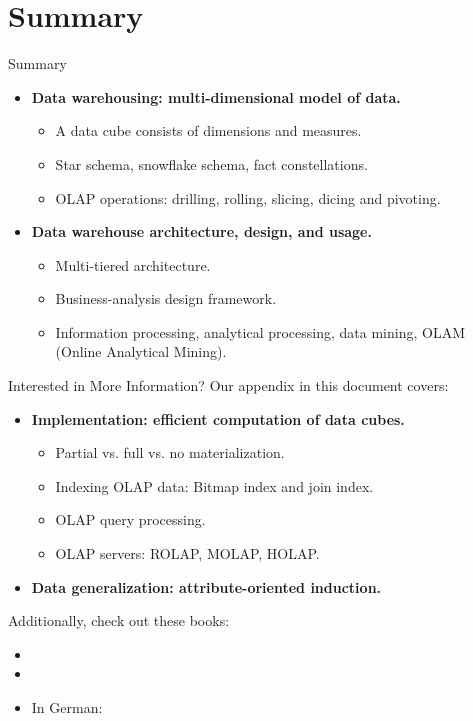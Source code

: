 \section{Summary}


\begin{frame}{Summary}
	\begin{itemize}
		\item \textbf{Data warehousing: multi-dimensional model of data.}
		      \begin{itemize}
			      \item A data cube consists of dimensions and measures.
			      \item Star schema, snowflake schema, fact constellations.
			      \item OLAP operations: drilling, rolling, slicing, dicing and pivoting.
		      \end{itemize}
		\item \textbf{Data warehouse architecture, design, and usage.}
		      \begin{itemize}
			      \item Multi-tiered architecture.
			      \item Business-analysis design framework.
			      \item Information processing, analytical processing, data mining, OLAM (Online Analytical Mining).
		      \end{itemize}
	\end{itemize}
\end{frame}


\begin{frame}{Interested in More Information?}
	Our appendix in this document covers:
	\begin{itemize}
		\item \textbf{Implementation: efficient computation of data cubes.}
		      \begin{itemize}
			      \item Partial vs. full vs. no materialization.
			      \item Indexing OLAP data: Bitmap index and join index.
			      \item OLAP query processing.
			      \item OLAP servers: ROLAP, MOLAP, HOLAP.
		      \end{itemize}
		\item \textbf{Data generalization: attribute-oriented induction.}
	\end{itemize}

	Additionally, check out these books:
	\begin{itemize}
		\item {}
		\item {}
		\item In German: 
	\end{itemize}
\end{frame}
